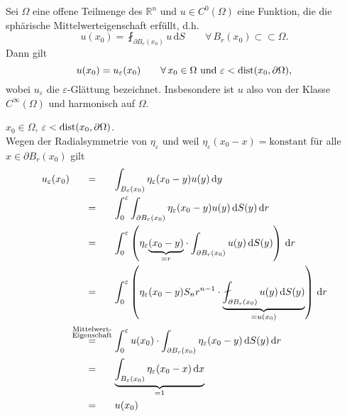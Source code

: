 \begin{satz}
	Sei $\Omega$ eine offene Teilmenge des $\mathbb{R}^n$ und $u \in C^0(\Omega)$ eine Funktion, die die sphärische Mittelwerteigenschaft erfüllt, d.h.
	\begin{equation}
		u(x_0) = \fint_{\partial B_r(x_0)}^{} u\,\mathrm{d}S \qquad \forall\, B_r(x_0) \subset \subset \Omega. 
	\end{equation}
	Dann gilt
	\begin{equation}
		u(x_0) = u_{\varepsilon}(x_0) \qquad \forall\, x_0 \in \Omega \text{ und } \varepsilon < \operatorname{dist}(x_0,\partial \Omega),
	\end{equation}
	wobei $u_{\varepsilon}$ die $\varepsilon$-Glättung bezeichnet. Insbesondere ist $u$ also von der Klasse $C^{\infty}(\Omega)$ und harmonisch auf $\Omega$.
\end{satz}
\begin{beweis}
	$x_0 \in \Omega$, $\varepsilon < \operatorname{dist}(x_0, \partial \Omega)$. \\
	Wegen der Radialsymmetrie von $\eta _{\varepsilon}$ und weil $\eta _{\varepsilon}(x_0-x)= \text{konstant}$ für alle $x \in \partial B_r(x_0)$ gilt
	\begin{align*}
		u_{\varepsilon}(x_0) &\stackrel{\hphantom{\substack{\text{Mittelwert-} \\ \text{Eigenschaft}}}}{=} \int_{B_{\varepsilon}(x_0)}^{}\eta_{\varepsilon}(x_0-y) u(y) 
		\,\mathrm{d}y \\
		&\stackrel{\hphantom{\substack{\text{Mittelwert-} \\ \text{Eigenschaft}}}}{=} \int_{0}^{\varepsilon} \int_{\partial B_r(x_0)}^{} \eta_{\varepsilon}(x_0-y)u(y)
		 \,\mathrm{d}S(y) \,\mathrm{d}r \\
		&\stackrel{\hphantom{\substack{\text{Mittelwert-} \\ \text{Eigenschaft}}}}{=} \int_{0}^{\varepsilon} 
		\left(\eta_{\varepsilon}\underset{=r}{\underbrace{(x_0-y)}} \cdot \int_{\partial B_r(x_0)}^{}u(y) \,\mathrm{d}S(y) \right) \,\mathrm{d}r \\
		&\stackrel{\hphantom{\substack{\text{Mittelwert-} \\ \text{Eigenschaft}}}}{=} \int_{0}^{\varepsilon} \left( \eta_{\varepsilon}(x_0-y)S_nr^{n-1} \cdot 
		\underset{=u(x_0)}{\underbrace{\fint_{\partial B_r(x_0)}^{}u(y) \,\mathrm{d}S(y)}} \right) \,\mathrm{d}r \\
		& \stackrel{\substack{\text{Mittelwert-} \\ \text{Eigenschaft}}}{=} \int_{0}^{\varepsilon}u(x_0) \cdot \int_{\partial B_r(x_0)}^{} \eta_{\varepsilon}(x_0-y)
		\,\mathrm{d}S(y) \,\mathrm{d}r \\
		&\stackrel{\hphantom{\substack{\text{Mittelwert-} \\ \text{Eigenschaft}}}}{=} 
		\underset{=1}{\underbrace{\int_{B_{\varepsilon}(x_0)}^{} \eta_{\varepsilon}(x_0-x) \,\mathrm{d}x}} \\
		&\stackrel{\hphantom{\substack{\text{Mittelwert-} \\ \text{Eigenschaft}}}}{=} u(x_0)
	\end{align*}
\end{beweis}

